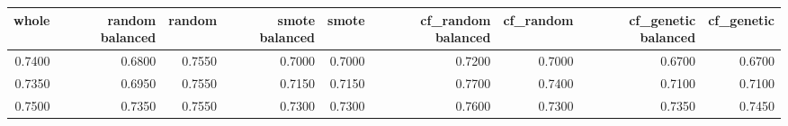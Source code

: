 \begin{tabular}{rrrrrrrrr}
\toprule

 whole &  random balanced &  random &  smote balanced &  smote &  cf\_random balanced &  cf\_random &  cf\_genetic balanced &  cf\_genetic \\
\midrule

0.7400 &           0.6800 &  0.7550 &          0.7000 & 0.7000 &              0.7200 &     0.7000 &               0.6700 &      0.6700 \\
0.7350 &           0.6950 &  0.7550 &          0.7150 & 0.7150 &              0.7700 &     0.7400 &               0.7100 &      0.7100 \\
0.7500 &           0.7350 &  0.7550 &          0.7300 & 0.7300 &              0.7600 &     0.7300 &               0.7350 &      0.7450 \\

\bottomrule
\end{tabular}
